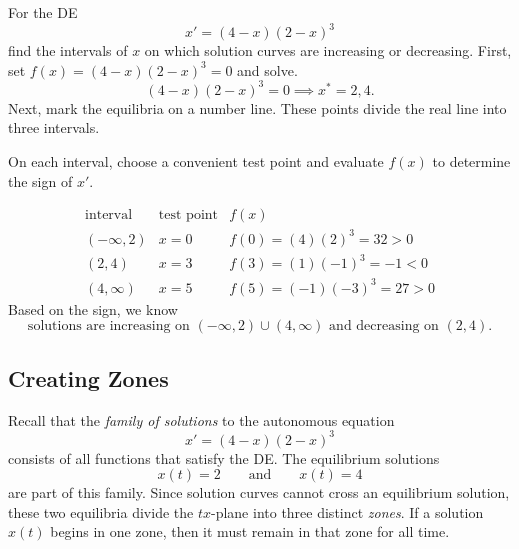 \documentclass[10pt,letterpaper]{article}
\begin{document}
\begin{example}[1]{
For the DE 
$$
x' = (4-x)(2-x)^3
$$
find the intervals of $x$ on which solution curves are increasing or decreasing.
}
First, set $f(x)=(4-x)(2-x)^3=0$ and solve. 
$$
(4-x)(2-x)^3=0 \implies x^*=2,4.
$$
Next, mark the equilibria on a number line. These points divide the real line into three intervals.

\begin{figure}[H]
    \centering
{}
\end{figure}
On each interval, choose a convenient test point and evaluate $f(x)$ to determine the sign of $x'$.

\[
\begin{array}{c|c|c}
\text{interval} & \text{test point} & f(x) \\
\hline
(-\infty,2) & x=0 & f(0)=(4)(2)^3=32>0 \\
(2,4) & x=3 & f(3)=(1)(-1)^3=-1<0 \\
(4,\infty) & x=5 & f(5)=(-1)(-3)^3=27>0
\end{array}
\]    
Based on the sign, we know 
\[
\boxed{
\text{solutions are increasing on }(-\infty,2)\cup(4,\infty)
\text{ and decreasing on }(2,4).
}
\]
\end{example}

\subsection{Creating Zones}
Recall that the \textit{family of solutions} to the autonomous equation
\[
x' = (4-x)(2-x)^3
\]
consists of all functions that satisfy the DE. The equilibrium solutions
\[
x(t)=2
\qquad \text{and} \qquad
x(t)=4
\]
are part of this family. Since solution curves cannot cross an equilibrium solution, these two equilibria divide the $tx$-plane into three distinct \textit{zones}. If a solution $x(t)$ begins in one zone, then it must remain in that zone for all time.
\end{document}
